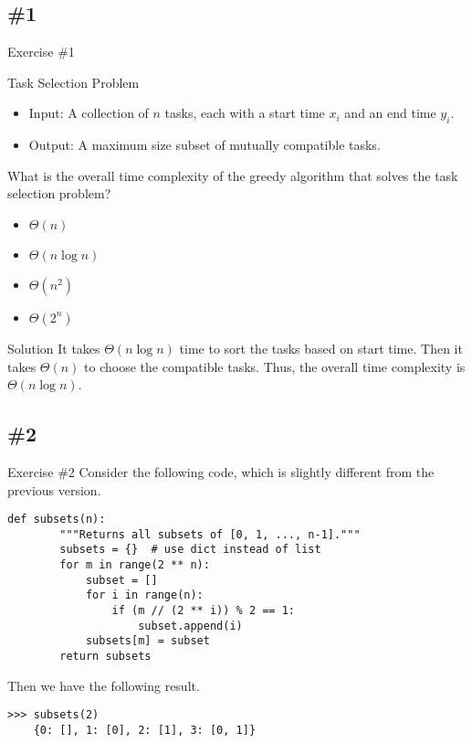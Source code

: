 \documentclass{beamer}
\begin{document}
\subsection{\#1}
\begin{frame}{Exercise \#1}
  \begin{block}{Task Selection Problem}
    \begin{itemize}
      \item Input: A collection of $n$ tasks, each with a start time $x_i$
      and an end time $y_i$.
      \item Output: A maximum size subset of mutually compatible tasks.
    \end{itemize}
  \end{block}
  What is the overall time complexity of the greedy algorithm that solves the
  task selection problem?
  \begin{multicols}{4}
    \begin{itemize}
      \item $\Theta(n)$
      \item $\Theta(n \log n)$
      \item $\Theta(n^2)$
      \item $\Theta(2^n)$ \pause
    \end{itemize}
  \end{multicols}
  \begin{block}{Solution}
    It takes $\Theta(n \log n)$ time to sort the tasks based on start time.
    Then it takes $\Theta(n)$ to choose the compatible tasks.
    Thus, the overall time complexity is $\Theta(n \log n)$.
  \end{block}
\end{frame}

\subsection{\#2}
\begin{frame}[fragile]{Exercise \#2}
  Consider the following code, which is slightly different from the previous
  version.
  \begin{block}{}
    \scriptsize
    \begin{lstlisting}[gobble=4]
    def subsets(n):
        """Returns all subsets of [0, 1, ..., n-1]."""
        subsets = {}  # use dict instead of list
        for m in range(2 ** n):
            subset = []
            for i in range(n):
                if (m // (2 ** i)) % 2 == 1:
                    subset.append(i)
            subsets[m] = subset
        return subsets
    \end{lstlisting}
  \end{block}
  \pause
  Then we have the following result.
  \begin{block}{}
    \scriptsize
    \begin{lstlisting}[gobble=4]
    >>> subsets(2)
    {0: [], 1: [0], 2: [1], 3: [0, 1]}
    \end{lstlisting}
  \end{block}
\end{frame}
\end{document}
